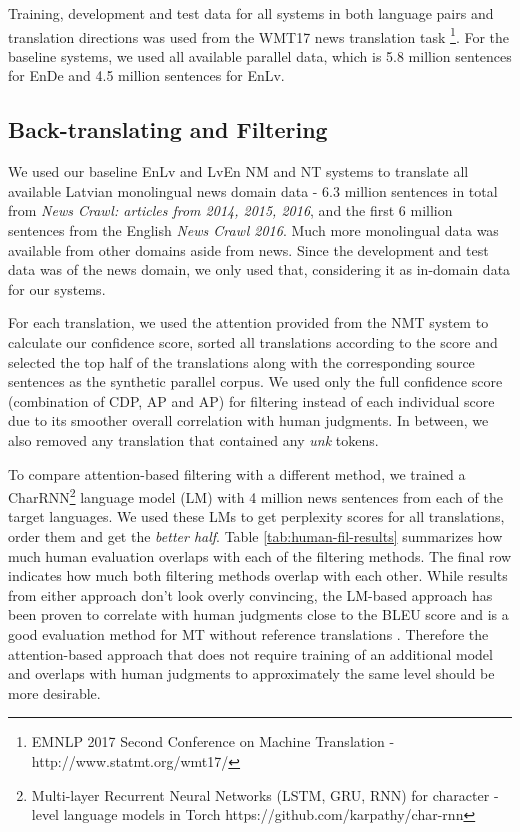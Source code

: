 \documentclass[]{article}
\begin{document}
Training, development and test data for all systems in both language pairs and translation directions was used from the WMT17 news translation task \footnote{EMNLP 2017 Second Conference on Machine Translation - http://www.statmt.org/wmt17/}. For the baseline systems, we used all available parallel data, which is 5.8 million sentences for EnDe and 4.5 million sentences for EnLv.  

\iffalse
The same amount of first sentences were used from English and German \textit{News Crawl: articles from 2016}.
\fi

\subsection{Back-translating and Filtering}
We used our baseline EnLv and LvEn NM and NT systems to translate all available Latvian monolingual news domain data - 6.3 million sentences in total from \textit{News Crawl: articles from 2014, 2015, 2016}, and the first 6 million sentences from the English \textit{News Crawl 2016}. Much more monolingual data was available from other domains aside from news. Since the development and test data was of the news domain, we only used that, considering it as in-domain data for our systems.

For each translation, we used the attention provided from the NMT system to calculate our confidence score, sorted all translations according to the score and selected the top half of the translations along with the corresponding source sentences as the synthetic parallel corpus. We used only the full confidence score (combination of CDP, AP and AP) for filtering instead of each individual score due to its smoother overall correlation with human judgments. In between, we also removed any translation that contained any \textit{unk} tokens. 

To compare attention-based filtering with a different method, we trained a CharRNN\footnote{Multi-layer Recurrent Neural Networks (LSTM, GRU, RNN) for character - level language models in Torch https://github.com/karpathy/char-rnn} language model (LM) with 4 million news sentences from each of the target languages. We used these LMs to get perplexity scores for all translations, order them and get the \textit{better half}. Table \ref{tab:human-fil-results} summarizes how much human evaluation overlaps with each of the filtering methods. The final row indicates how much both filtering methods overlap with each other. While results from either approach don't look overly convincing, the LM-based approach has been proven to correlate with human judgments close to the BLEU score and is a good evaluation method for MT without reference translations \citep{gamon2005sentence}. Therefore the attention-based approach that does not require training of an additional model and overlaps with human judgments to approximately the same level should be more desirable.  
\end{document}
